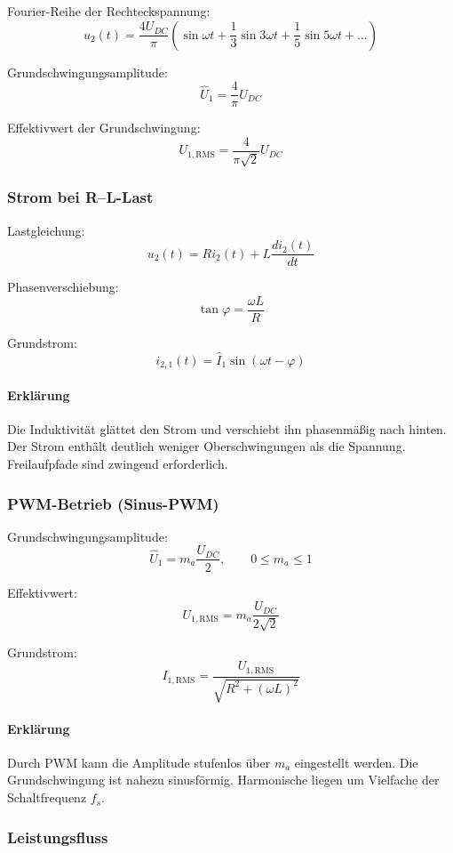 Fourier-Reihe der Rechteckspannung:
\[
\boxed{
u_2(t) = \frac{4U_{DC}}{\pi}
\left(
\sin\omega t + \frac{1}{3}\sin 3\omega t + \frac{1}{5}\sin 5\omega t + \ldots
\right)
}
\]

Grundschwingungsamplitude:
\[
\boxed{\hat U_1 = \frac{4}{\pi} U_{DC}}
\]

Effektivwert der Grundschwingung:
\[
\boxed{U_{1,\mathrm{RMS}} = \frac{4}{\pi\sqrt{2}} U_{DC}}
\]

\subsubsection{Strom bei R--L-Last}

Lastgleichung:
\[
\boxed{u_2(t) = R i_2(t) + L \frac{di_2(t)}{dt}}
\]

Phasenverschiebung:
\[
\boxed{\tan\varphi = \frac{\omega L}{R}}
\]

Grundstrom:
\[
\boxed{i_{2,1}(t) = \hat I_1 \sin(\omega t - \varphi)}
\]

\paragraph{Erklärung}

Die Induktivität glättet den Strom und verschiebt ihn phasenmäßig nach hinten.
Der Strom enthält deutlich weniger Oberschwingungen als die Spannung.
Freilaufpfade sind zwingend erforderlich.

\subsubsection{PWM-Betrieb (Sinus-PWM)}

Grundschwingungsamplitude:
\[
\boxed{\hat U_1 = m_a \frac{U_{DC}}{2}}, 
\qquad 0 \le m_a \le 1
\]

Effektivwert:
\[
\boxed{U_{1,\mathrm{RMS}} = m_a \frac{U_{DC}}{2\sqrt{2}}}
\]

Grundstrom:
\[
\boxed{I_{1,\mathrm{RMS}} = \frac{U_{1,\mathrm{RMS}}}{\sqrt{R^2 + (\omega L)^2}}}
\]

\paragraph{Erklärung}

Durch PWM kann die Amplitude stufenlos über $m_a$ eingestellt werden.
Die Grundschwingung ist nahezu sinusförmig.
Harmonische liegen um Vielfache der Schaltfrequenz $f_s$.

\subsubsection{Leistungsfluss}

